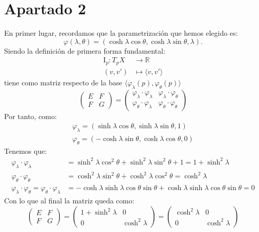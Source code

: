 \section{Apartado 2}
En primer lugar, recordamos que la parametrización que hemos elegido es:
\[
\varphi\left( \lambda, \theta \right) = \left( \cosh \lambda \cos \theta,
\cosh \lambda \sin \theta, \lambda \right).
\]
Siendo la definición de primera forma fundamental:
\begin{align*}
    \mathrm{I}_p: T_pX &\rightarrow \mathbb{R}\\
    \left( v, v' \right) &\mapsto \langle v, v' \rangle
\end{align*}
tiene como matriz respecto de la base $\langle \varphi_{\lambda}\left( p \right),
\varphi_{\theta}\left( p \right) \rangle$
\[
    \begin{pmatrix} E & F\\ F & G \end{pmatrix} = \begin{pmatrix} 
    \varphi_{\lambda} \cdot \varphi_{\lambda} & \varphi_{\lambda} \cdot \varphi_{\theta}\\
    \varphi_{\theta} \cdot \varphi_{\lambda} & \varphi_{\theta} \cdot
    \varphi_{\theta}
    \end{pmatrix}
\]
Por tanto, como:
\begin{gather*}
    \varphi_{\lambda} = \left( \sinh \lambda \cos \theta, \sinh \lambda \sin
    \theta, 1 \right)\\
    \varphi_{\theta} = \left( -\cosh \lambda \sin \theta, \cosh \lambda \cos
    \theta, 0 \right)
\end{gather*}
Tenemos que:
\begin{align*}
    \varphi_{\lambda} \cdot \varphi_{\lambda} &= \sinh^2 \lambda \cos^2 \theta +
    \sinh^2 \lambda \sin^2 \theta + 1 = 1 + \sinh^2 \lambda\\
    \varphi_{\theta} \cdot \varphi_{\theta} &= \cosh^2 \lambda \sin^2 \theta +
    \cosh^2 \lambda \cos^2 \theta = \cosh^2 \lambda\\
    \varphi_{\lambda} \cdot \varphi_{\theta} = \varphi_{\theta} \cdot
    \varphi_{\lambda} &= -\cosh \lambda \sinh \lambda \cos \theta \sin \theta +
    \cosh \lambda \sinh \lambda \cos \theta \sin \theta = 0
\end{align*}
Con lo que al final la matriz queda como:
\[
    \begin{pmatrix} E & F\\ F & G \end{pmatrix} = \begin{pmatrix} 
    1 + \sinh^2 \lambda & 0\\
    0 & \cosh^2 \lambda
    \end{pmatrix} = \begin{pmatrix} 
    \cosh^2 \lambda & 0\\
    0 & \cosh^2 \lambda
    \end{pmatrix}
\]

